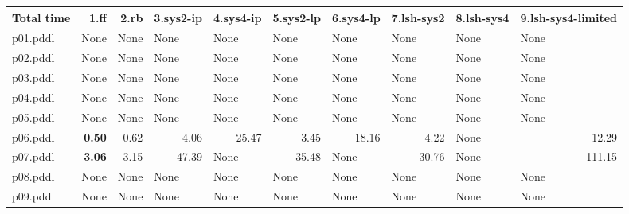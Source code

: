 \documentclass{article}
\begin{document}
\begin{tabular}{@{}lrrrrrrrrr@{}}
Total time & 1.ff & 2.rb & 3.sys2-ip & 4.sys4-ip & 5.sys2-lp & 6.sys4-lp & 7.lsh-sys2 & 8.lsh-sys4 & 9.lsh-sys4-limited \\
\midrule
p01.pddl & \multicolumn{1}{|l|}{None} & \multicolumn{1}{|l|}{None} & \multicolumn{1}{|l|}{None} & \multicolumn{1}{|l|}{None} & \multicolumn{1}{|l|}{None} & \multicolumn{1}{|l|}{None} & \multicolumn{1}{|l|}{None} & \multicolumn{1}{|l|}{None} & \multicolumn{1}{|l|}{None} \\
p02.pddl & \multicolumn{1}{|l|}{None} & \multicolumn{1}{|l|}{None} & \multicolumn{1}{|l|}{None} & \multicolumn{1}{|l|}{None} & \multicolumn{1}{|l|}{None} & \multicolumn{1}{|l|}{None} & \multicolumn{1}{|l|}{None} & \multicolumn{1}{|l|}{None} & \multicolumn{1}{|l|}{None} \\
p03.pddl & \multicolumn{1}{|l|}{None} & \multicolumn{1}{|l|}{None} & \multicolumn{1}{|l|}{None} & \multicolumn{1}{|l|}{None} & \multicolumn{1}{|l|}{None} & \multicolumn{1}{|l|}{None} & \multicolumn{1}{|l|}{None} & \multicolumn{1}{|l|}{None} & \multicolumn{1}{|l|}{None} \\
p04.pddl & \multicolumn{1}{|l|}{None} & \multicolumn{1}{|l|}{None} & \multicolumn{1}{|l|}{None} & \multicolumn{1}{|l|}{None} & \multicolumn{1}{|l|}{None} & \multicolumn{1}{|l|}{None} & \multicolumn{1}{|l|}{None} & \multicolumn{1}{|l|}{None} & \multicolumn{1}{|l|}{None} \\
p05.pddl & \multicolumn{1}{|l|}{None} & \multicolumn{1}{|l|}{None} & \multicolumn{1}{|l|}{None} & \multicolumn{1}{|l|}{None} & \multicolumn{1}{|l|}{None} & \multicolumn{1}{|l|}{None} & \multicolumn{1}{|l|}{None} & \multicolumn{1}{|l|}{None} & \multicolumn{1}{|l|}{None} \\
p06.pddl & \textbf{0.50} & 0.62 & 4.06 & 25.47 & 3.45 & 18.16 & 4.22 & \multicolumn{1}{|l|}{None} & 12.29 \\
p07.pddl & \textbf{3.06} & 3.15 & 47.39 & \multicolumn{1}{|l|}{None} & 35.48 & \multicolumn{1}{|l|}{None} & 30.76 & \multicolumn{1}{|l|}{None} & 111.15 \\
p08.pddl & \multicolumn{1}{|l|}{None} & \multicolumn{1}{|l|}{None} & \multicolumn{1}{|l|}{None} & \multicolumn{1}{|l|}{None} & \multicolumn{1}{|l|}{None} & \multicolumn{1}{|l|}{None} & \multicolumn{1}{|l|}{None} & \multicolumn{1}{|l|}{None} & \multicolumn{1}{|l|}{None} \\
p09.pddl & \multicolumn{1}{|l|}{None} & \multicolumn{1}{|l|}{None} & \multicolumn{1}{|l|}{None} & \multicolumn{1}{|l|}{None} & \multicolumn{1}{|l|}{None} & \multicolumn{1}{|l|}{None} & \multicolumn{1}{|l|}{None} & \multicolumn{1}{|l|}{None} & \multicolumn{1}{|l|}{None} \\

\end{tabular}
\end{document}
